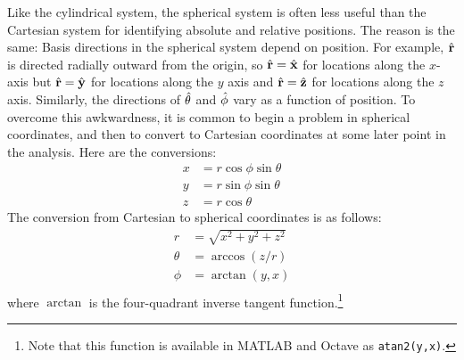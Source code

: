 Like the cylindrical system, the spherical system is often less useful than the Cartesian system for identifying absolute and relative positions.
The reason is the same: Basis directions in the spherical system depend on position.
For example, $\hat{\bf r}$ is directed radially outward from the origin, so $\hat{\bf r}=\hat{\bf x}$ for locations along the $x$-axis but $\hat{\bf r}=\hat{\bf y}$ for locations along the $y$ axis and $\hat{\bf r}=\hat{\bf z}$ for locations along the $z$ axis.
Similarly, the directions of $\hat{\bf \theta}$ and $\hat{\bf \phi}$ vary as a function of position.
To overcome this awkwardness, it is common to begin a problem in spherical coordinates, and then to convert to Cartesian coordinates at some later point in the analysis.  
Here are the conversions:
%
\begin{align}
x &= r \cos\phi \sin\theta \label{m0097_es2cx} \\
y &= r \sin\phi \sin\theta \label{m0097_es2cy} \\
z &= r \cos\theta          \label{m0097_es2cz}
\end{align}
%
The conversion from Cartesian to spherical coordinates is as follows:
%
\begin{align}
r      &= \sqrt{x^2+y^2+z^2}      \\
\theta &= \arccos\left(z/r\right) \\
\phi   &= \arctan\left(y,x\right) \\
\end{align}
%
where $\arctan$ is the four-quadrant inverse tangent function.\footnote{Note that this function is available in MATLAB and Octave as {\tt atan2(y,x)}.}

